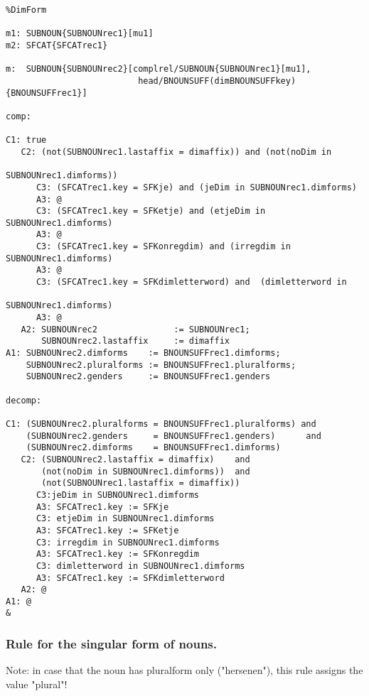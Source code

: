 \begin{verbatim}
%DimForm

m1: SUBNOUN{SUBNOUNrec1}[mu1]
m2: SFCAT{SFCATrec1}

m:  SUBNOUN{SUBNOUNrec2}[complrel/SUBNOUN{SUBNOUNrec1}[mu1], 
                          head/BNOUNSUFF(dimBNOUNSUFFkey){BNOUNSUFFrec1}]

comp:

C1: true
   C2: (not(SUBNOUNrec1.lastaffix = dimaffix)) and (not(noDim in 
                                                     SUBNOUNrec1.dimforms))
      C3: (SFCATrec1.key = SFKje) and (jeDim in SUBNOUNrec1.dimforms)
      A3: @
      C3: (SFCATrec1.key = SFKetje) and (etjeDim in SUBNOUNrec1.dimforms)  
      A3: @
      C3: (SFCATrec1.key = SFKonregdim) and (irregdim in SUBNOUNrec1.dimforms)
      A3: @
      C3: (SFCATrec1.key = SFKdimletterword) and  (dimletterword in
                                                         SUBNOUNrec1.dimforms)
      A3: @
   A2: SUBNOUNrec2               := SUBNOUNrec1;
       SUBNOUNrec2.lastaffix     := dimaffix
A1: SUBNOUNrec2.dimforms    := BNOUNSUFFrec1.dimforms;
    SUBNOUNrec2.pluralforms := BNOUNSUFFrec1.pluralforms;
    SUBNOUNrec2.genders     := BNOUNSUFFrec1.genders

decomp:

C1: (SUBNOUNrec2.pluralforms = BNOUNSUFFrec1.pluralforms) and
    (SUBNOUNrec2.genders     = BNOUNSUFFrec1.genders)      and
    (SUBNOUNrec2.dimforms    = BNOUNSUFFrec1.dimforms)
   C2: (SUBNOUNrec2.lastaffix = dimaffix)    and 
       (not(noDim in SUBNOUNrec1.dimforms))  and 
       (not(SUBNOUNrec1.lastaffix = dimaffix))  
      C3:jeDim in SUBNOUNrec1.dimforms
      A3: SFCATrec1.key := SFKje
      C3: etjeDim in SUBNOUNrec1.dimforms
      A3: SFCATrec1.key := SFKetje
      C3: irregdim in SUBNOUNrec1.dimforms
      A3: SFCATrec1.key := SFKonregdim
      C3: dimletterword in SUBNOUNrec1.dimforms
      A3: SFCATrec1.key := SFKdimletterword
   A2: @
A1: @
&
\end{verbatim}
\newpage
\subsubsection{ Rule for the singular form of nouns. }

Note: in case that the noun has pluralform only ("hersenen"), this rule 
      assigns the value "plural"!


